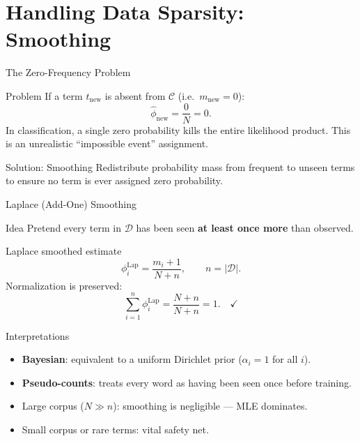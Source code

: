 \section{Handling Data Sparsity: Smoothing}

\begin{frame}{The Zero-Frequency Problem}
  \begin{alertblock}{Problem}
    If a term $t_{\mathrm{new}}$ is absent from $\mathcal{C}$ (i.e.\ $m_{\mathrm{new}}=0$):
    \[
      \hat\phi_{\mathrm{new}}=\frac{0}{N}=0.
    \]
    In classification, a single zero probability kills the entire likelihood product.
    This is an unrealistic ``impossible event'' assignment.
  \end{alertblock}

  \begin{block}{Solution: Smoothing}
    Redistribute probability mass from frequent to unseen terms to ensure
    no term is ever assigned zero probability.
  \end{block}
\end{frame}

\begin{frame}{Laplace (Add-One) Smoothing}
  \begin{block}{Idea}
    Pretend every term in $\mathcal{D}$ has been seen \textbf{at least once more} than observed.
  \end{block}

  \begin{block}{Laplace smoothed estimate}
    \[
      \phi_i^{\mathrm{Lap}}=\frac{m_i+1}{N+n},\qquad n=|\mathcal{D}|.
    \]
    Normalization is preserved:
    \[
      \sum_{i=1}^n\phi_i^{\mathrm{Lap}}=\frac{N+n}{N+n}=1.\quad\checkmark
    \]
  \end{block}

  \begin{block}{Interpretations}
    \begin{itemize}
      \item \textbf{Bayesian}: equivalent to a uniform Dirichlet prior ($\alpha_i=1$ for all $i$).
      \item \textbf{Pseudo-counts}: treats every word as having been seen once before training.
      \item Large corpus ($N\gg n$): smoothing is negligible — MLE dominates.
      \item Small corpus or rare terms: vital safety net.
    \end{itemize}
  \end{block}
\end{frame}

